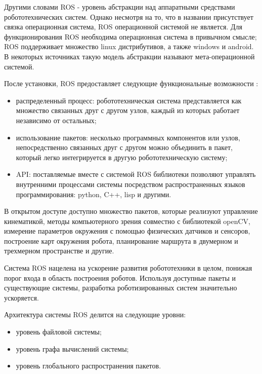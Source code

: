 \documentclass[oneside,final,14pt]{extreport}
\newcommand{\indentSpace}{1.25cm}
\newlength{\mylength}
\begin{document}
Другими словами ROS -  уровень абстракции над аппаратными средствами робототехнических систем. Однако несмотря на то, что в названии присутствует связка операционная система, ROS операционной системой не является. Для функционирования ROS необходима операционная система в привычном смысле; ROS поддерживает множество linux дистрибутивов, а также windows и android.  В некоторых источниках такую модель абстракции называют мета-операционной системой.

После установки, ROS предоставляет следующие функциональные возможности \cite{RosBookTurtle}: 
\begin{itemize}
\item распределенный процесс: робототехническая система представляется как множество связанных друг с другом узлов, каждый из которых работает независимо от остальных;
\end{itemize}
\begin{itemize}[leftmargin=\mylength]

\item использование пакетов: несколько программных компонентов или узлов, непосредственно связанных друг с другом можно объединить в пакет, который легко интегрируется в другую робототехническую систему;
\item API: поставляемые вместе с системой ROS библиотеки позволяют управлять внутренними процессами системы посредством распространенных языков программирования: python, C++, lisp и другими.
\end{itemize}

В открытом доступе доступно множество пакетов, которые реализуют управление кинематикой, методы компьютерного зрения совместно с библиотекой openCV, измерение параметров окружения с помощью физических датчиков и сенсоров, построение карт окружения робота, планирование маршрута в двумерном и трехмерном пространстве и другие.

Система ROS нацелена на ускорение развития робототехники в целом, понижая порог входа в область построения роботов. Используя доступные пакеты и существующие системы, разработка роботизированных систем значительно ускоряется. 

Архитектура системы ROS делится на следующие уровни:
\begin{itemize}
\item уровень файловой системы;
\setlength{\itemindent}{-\indentSpace }
\item уровень графа вычислений системы;
\item уровень глобального распространения пакетов.
\end{itemize}
\end{document}
